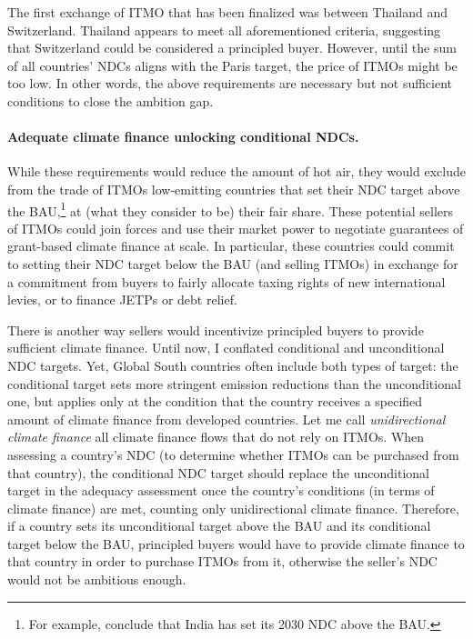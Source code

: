 \documentclass[12pt,english]{article}
\begin{document}
The first exchange of ITMO that has been finalized was between Thailand and Switzerland. %
Thailand appears to meet all aforementioned criteria, suggesting that Switzerland could be considered a principled buyer. However, until the sum of all countries' NDCs aligns with the Paris target, the price of ITMOs might be too low. In other words, the above requirements are necessary but not sufficient conditions to close the ambition gap. %

\paragraph{Adequate climate finance unlocking conditional NDCs.} %
While these requirements would reduce the amount of hot air, they would exclude from the trade of ITMOs low-emitting countries that set their NDC target above the BAU,\footnote{For example, \cite{van_den_berg_implications_2020} conclude that India has set its 2030 NDC above the BAU. %
} 
at (what they consider to be) their fair share. These potential sellers of ITMOs could join forces and use their market power to negotiate guarantees of grant-based climate finance at scale. In particular, these countries could commit to setting their NDC target below the BAU (and selling ITMOs) in exchange for a commitment from buyers to fairly allocate taxing rights of new international levies, or to finance JETPs or debt relief. 

There is another way sellers would incentivize principled buyers to provide sufficient climate finance. Until now, I conflated conditional and unconditional NDC targets. Yet, Global South countries often include both types of target: the conditional target sets more stringent emission reductions than the unconditional one, but applies only at the condition that the country receives a specified amount of climate finance from developed countries. Let me call \textit{unidirectional climate finance} all climate finance flows that do not rely on ITMOs. When assessing a country's NDC (to determine whether ITMOs can be purchased from that country), the conditional NDC target should replace the unconditional target in the adequacy assessment %
once the country's conditions (in terms of climate finance) are met, counting only unidirectional climate finance. Therefore, if a country sets its unconditional target above the BAU and its conditional target below the BAU, principled buyers would have to provide climate finance to that country in order to purchase ITMOs from it, otherwise the seller's NDC would not be ambitious enough.
\end{document}

